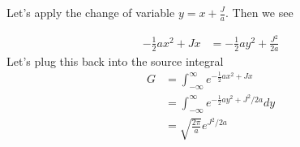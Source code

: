 \documentclass[book.tex]{subfiles}
\begin{document}
Let's apply the change of variable $y = x + \frac{J}{a}$. Then we see

\begin{align}
    -\frac{1}{2} a x^2 + J x &= -\frac{1}{2} a y^2 + \frac{J^2}{2a}
\end{align}
Let's plug this back into the source integral
\begin{align}
    G &= \int_{-\infty}^{\infty} e^{-\frac{1}{2}ax^2 + Jx} \\
    &= \int_{-\infty}^{\infty} e^{-\frac{1}{2}ay^2 + J^2/2a} dy \\
    &= \sqrt{\frac{2 \pi}{a}} e^{J^2/2a}
\end{align}
\end{document}
